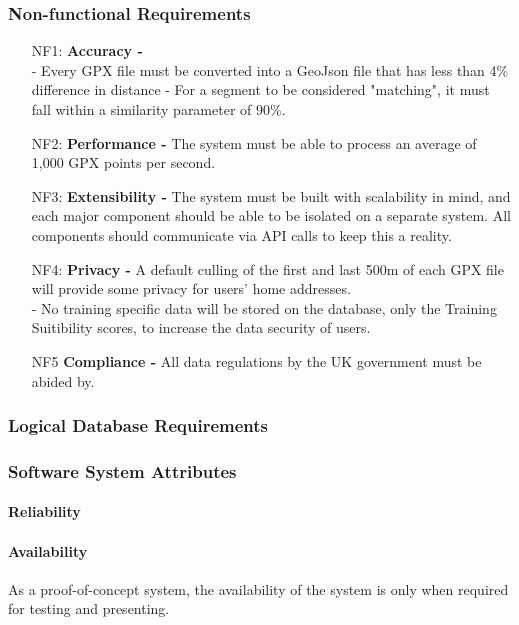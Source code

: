 \documentclass[11pt,a4paper]{report}
\begin{document}
\subsubsection{Non-functional Requirements}
\begin{enumerate}
	\item[NF1:] \textbf{Accuracy - } \\
	      - Every GPX file must be converted into a GeoJson file that has less than 4\% difference in distance
	      - For a segment to be considered "matching", it must fall within a similarity parameter of 90\%.
	\item[NF2:] \textbf{Performance - } The system must be able to process an average of 1,000 GPX points per second.
	\item[NF3:] \textbf{Extensibility - } The system must be built with scalability in mind, and each major component should be able to be isolated
	      on a separate system. All components should communicate via API calls to keep this a reality.
	\item[NF4:] \textbf{Privacy - } A default culling of the first and last 500m of each GPX file will provide some privacy for users' home addresses.\\
	      - No training specific data will be stored on the database, only the Training Suitibility scores, to increase the data security of
	      users.
	\item[NF5] \textbf{Compliance - } All data regulations by the UK government must be abided by.
\end{enumerate}


\subsubsection{Logical Database Requirements}

\subsubsection{Software System Attributes}
\paragraph{Reliability}

\paragraph{Availability}
As a proof-of-concept system, the availability of the system is only when required for testing and presenting.
\end{document}

